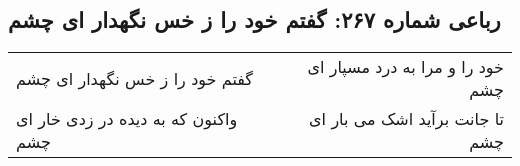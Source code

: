 \begin{center}
\section*{رباعی شماره ۲۶۷: گفتم خود را ز خس نگهدار ای چشم}
\label{sec:sh267}
\begin{longtable}{l p{0.5cm} r}
گفتم خود را ز خس نگهدار ای چشم
&&
خود را و مرا به درد مسپار ای چشم
\\
واکنون که به دیده در زدی خار ای چشم
&&
تا جانت برآید اشک می بار ای چشم
\\
\end{longtable}
\end{center}
